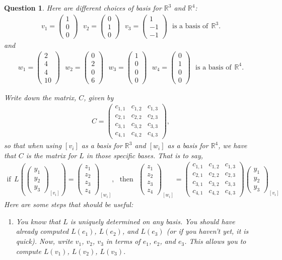 \documentclass[12pt]{article}
\newtheorem{question}[thm]{Question}
\def\real{{\mathbb R}}
\newcommand{\ColVecThree}[3]{\begin{pmatrix} #1\\ #2\\ #3\end{pmatrix}}
\newcommand{\ColVecFour}[4]{\begin{pmatrix} #1\\ #2\\#3 \\ #4\end{pmatrix}}
\begin{document}
\begin{question}
	\normalfont
	
	Here are different choices of basis for $\real^3$ and $\real^4$:
	\begin{align*}
		v_1 = \ColVecThree{1}{0}{0}\ \ \ 
		v_2 = \ColVecThree{0}{1}{0}\ \ \ 
		v_3 = \ColVecThree{1}{-1}{-1}\ \ \
		\text{is a basis of}\ \ \real^3. 
	\end{align*}
	and
	\begin{align*}
		w_1 = \ColVecFour{2}{4}{4}{10}\ \ \ 
		w_2 = \ColVecFour{0}{2}{0}{6}\ \ \ 
		w_3 = \ColVecFour{1}{0}{0}{0}\ \ \
		w_4 = \ColVecFour{0}{1}{0}{0}\ \ \
		\text{is a basis of}\ \ \real^4. 
	\end{align*}
	
	
	Write down the matrix, $C$, given by 
	\begin{align*}
			C = 
			 \begin{pmatrix}
			  c_{1,1} & c_{1,2} & c_{1,3} \\
			  c_{2,1} & c_{2,2} & c_{2,3} \\
			  c_{3,1} & c_{3,2} & c_{3,3} \\
			  c_{4,1} & c_{4,2} & c_{4,3} 
			 \end{pmatrix},
	\end{align*}
	so that when using $[v_i]$ as a basis for $\real^3$ and $[w_i]$ as a basis for $\real^4$, we have that $C$ is the matrix for $L$ in those specific bases.  That is to say, 
	\begin{align*}
		\text{if}\ \ L(\ColVecThree{y_1}{y_2}{y_3}_{[v_i]}) = \ColVecFour{z_1}{z_2}{z_3}{z_4}_{[w_i]},\ \ \ 
	\text{then}\ \ \ 
		\ColVecFour{z_1}{z_2}{z_3}{z_4}_{[w_i]} = 
	 \begin{pmatrix}
	  c_{1,1} & c_{1,2} & c_{1,3} \\
	  c_{2,1} & c_{2,2} & c_{2,3} \\
	  c_{3,1} & c_{3,2} & c_{3,3} \\
	  c_{4,1} & c_{4,2} & c_{4,3} 
	 \end{pmatrix}
	 \ColVecThree{y_1}{y_2}{y_3}_{[v_i]}
	\end{align*}
	Here are some steps that should be useful:
	\begin{enumerate}
		\item You know that $L$ is uniquely determined on any basis.  You should have already computed $L(e_1)$, $L(e_2)$, and $L(e_3)$ (or if you haven't yet, it is quick).  Now, write $v_1$, $v_2$, $v_3$ in terms of $e_1$, $e_2$, and $e_3$.  This allows you to compute $L(v_1)$, $L(v_2)$, $L(v_3)$.
		

\end{enumerate}
\end{question}
\end{document}

